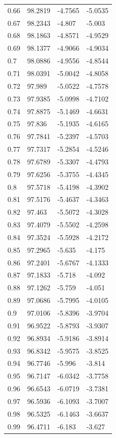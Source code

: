 \begin{tabular}{llll}
0.66 & 98.2819 & -4.7565 & -5.0535 \\
0.67 & 98.2343 & -4.807 & -5.003 \\
0.68 & 98.1863 & -4.8571 & -4.9529 \\
0.69 & 98.1377 & -4.9066 & -4.9034 \\
0.7 & 98.0886 & -4.9556 & -4.8544 \\
0.71 & 98.0391 & -5.0042 & -4.8058 \\
0.72 & 97.989 & -5.0522 & -4.7578 \\
0.73 & 97.9385 & -5.0998 & -4.7102 \\
0.74 & 97.8875 & -5.1469 & -4.6631 \\
0.75 & 97.836 & -5.1935 & -4.6165 \\
0.76 & 97.7841 & -5.2397 & -4.5703 \\
0.77 & 97.7317 & -5.2854 & -4.5246 \\
0.78 & 97.6789 & -5.3307 & -4.4793 \\
0.79 & 97.6256 & -5.3755 & -4.4345 \\
0.8 & 97.5718 & -5.4198 & -4.3902 \\
0.81 & 97.5176 & -5.4637 & -4.3463 \\
0.82 & 97.463 & -5.5072 & -4.3028 \\
0.83 & 97.4079 & -5.5502 & -4.2598 \\
0.84 & 97.3524 & -5.5928 & -4.2172 \\
0.85 & 97.2965 & -5.635 & -4.175 \\
0.86 & 97.2401 & -5.6767 & -4.1333 \\
0.87 & 97.1833 & -5.718 & -4.092 \\
0.88 & 97.1262 & -5.759 & -4.051 \\
0.89 & 97.0686 & -5.7995 & -4.0105 \\
0.9 & 97.0106 & -5.8396 & -3.9704 \\
0.91 & 96.9522 & -5.8793 & -3.9307 \\
0.92 & 96.8934 & -5.9186 & -3.8914 \\
0.93 & 96.8342 & -5.9575 & -3.8525 \\
0.94 & 96.7746 & -5.996 & -3.814 \\
0.95 & 96.7147 & -6.0342 & -3.7758 \\
0.96 & 96.6543 & -6.0719 & -3.7381 \\
0.97 & 96.5936 & -6.1093 & -3.7007 \\
0.98 & 96.5325 & -6.1463 & -3.6637 \\
0.99 & 96.4711 & -6.183 & -3.627 \\

\end{tabular}

